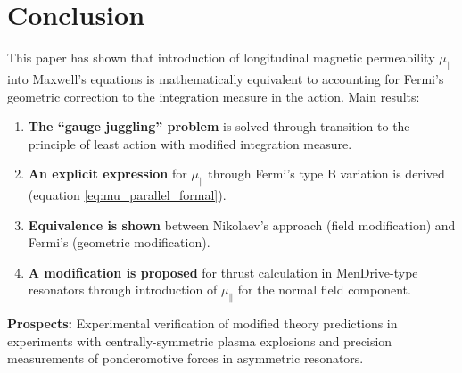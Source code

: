 \documentclass[12pt, a4paper]{article}
\begin{document}
\section{Conclusion}

This paper has shown that introduction of longitudinal magnetic permeability $\mu_{\parallel}$ into Maxwell's equations is mathematically equivalent to accounting for Fermi's geometric correction to the integration measure in the action. Main results:

\begin{enumerate}
    \item \textbf{The ``gauge juggling'' problem} is solved through transition to the principle of least action with modified integration measure.

    \item \textbf{An explicit expression} for $\mu_{\parallel}$ through Fermi's type B variation is derived (equation \ref{eq:mu_parallel_formal}).

    \item \textbf{Equivalence is shown} between Nikolaev's approach (field modification) and Fermi's (geometric modification).

    \item \textbf{A modification is proposed} for thrust calculation in MenDrive-type resonators through introduction of $\mu_{\parallel}$ for the normal field component.
\end{enumerate}

\textbf{Prospects:} Experimental verification of modified theory predictions in experiments with centrally-symmetric plasma explosions and precision measurements of ponderomotive forces in asymmetric resonators.
\end{document}
